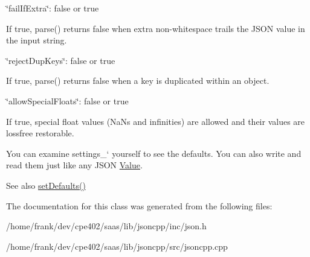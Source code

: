 \begin{DoxyItemize}
\begin{DoxyItemize}
\end{DoxyItemize}
\item {\ttfamily \char`\"{}fail\+If\+Extra\char`\"{}\+: false or true}
\begin{DoxyItemize}
\item If true, {\ttfamily parse()} returns false when extra non-\/whitespace trails the J\+S\+O\+N value in the input string.
\end{DoxyItemize}
\item {\ttfamily \char`\"{}reject\+Dup\+Keys\char`\"{}\+: false or true}
\begin{DoxyItemize}
\item If true, {\ttfamily parse()} returns false when a key is duplicated within an object.
\end{DoxyItemize}
\item {\ttfamily \char`\"{}allow\+Special\+Floats\char`\"{}\+: false or true}
\begin{DoxyItemize}
\item If true, special float values (Na\+Ns and infinities) are allowed and their values are lossfree restorable.
\end{DoxyItemize}
\end{DoxyItemize}

You can examine \textquotesingle{}settings\+\_\+` yourself to see the defaults. You can also write and read them just like any J\+S\+O\+N \hyperlink{class_json_1_1_value}{Value}. \begin{DoxySeeAlso}{See also}
\hyperlink{class_json_1_1_char_reader_builder_a03ff031e06aabff989ab4addc87294ab}{set\+Defaults()} 
\end{DoxySeeAlso}


The documentation for this class was generated from the following files\+:\begin{DoxyCompactItemize}
\item 
/home/frank/dev/cpe402/saas/lib/jsoncpp/inc/json.\+h\item 
/home/frank/dev/cpe402/saas/lib/jsoncpp/src/jsoncpp.\+cpp\end{DoxyCompactItemize}
